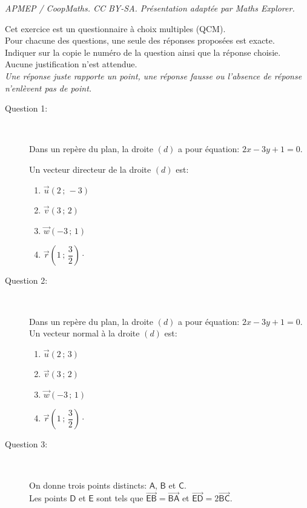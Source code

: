 \documentclass[10pt]{article}
\providecommand{\vect}[1]{\overrightarrow{#1}}
\begin{document}
\noindent\textit{APMEP / CoopMaths. CC BY-SA. Présentation adaptée par Maths Explorer.}\par\medskip
\medskip

Cet exercice est un questionnaire à choix multiples (QCM).\\
Pour chacune des questions, une seule des réponses proposées est exacte.\\
Indiquer sur la copie le numéro de la question ainsi que la réponse choisie.\\
Aucune justification n'est attendue.\\
\emph{Une réponse juste rapporte un point, une
réponse fausse ou l'absence de réponse n'enlèvent pas de point.}

\begin{description}
\item[Question 1:]\ 

Dans un repère du plan, la droite $(d)$ a pour équation: $2x-3y+1=0$.

Un vecteur directeur de la droite $(d)$ est:

\begin{enumerate}[label=\textbf{\alph{*}.},itemjoin=\hfil,afterlabel={~~}]
\item $\vect{u}(2\,;\,-3)$ \item $\vect{v}(3\,;\,2)$ \item $\vect{w}(-3\,;\,1)$ \item $\vect{r}\left(1\,;\,\dfrac{3}{2}\right)\cdotp$
\end{enumerate}

\item[Question 2:]\ 

Dans un repère du plan, la droite $(d)$ a pour équation: $2x-3y+1=0$. Un vecteur normal à la droite $(d)$
est:

\begin{enumerate}[label=\textbf{\alph{*}.},itemjoin=\hfil,afterlabel={~~}]
\item $\vect{u}(2\,;\,3)$ \item $\vect{v}(3\,;\,2)$ \item $\vect{w}(-3\,;\,1)$ \item $\vect{r}\left(1\,;\,\dfrac{3}{2}\right)\cdotp$
\end{enumerate}

\item[Question 3:]\ 

On donne trois points distincts: $\mathsf{A}$, $\mathsf{B}$ et $\mathsf{C}$.\\
Les points $\mathsf{D}$ et $\mathsf{E}$ sont tels que $\vect{\mathsf{EB}}=\vect{\mathsf{BA}}$ et $\vect{\mathsf{ED}}=2\vect{\mathsf{BC}}$.


\end{description}
\end{document}
